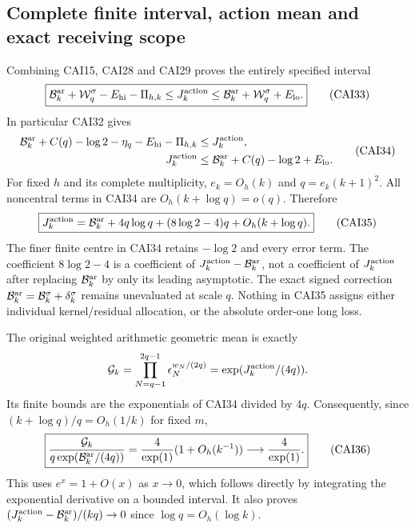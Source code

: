 \documentclass[11pt,a4paper]{article}
\begin{document}
\subsection{Complete finite interval, action mean and exact receiving scope}

Combining CAI15, CAI28 and CAI29 proves the entirely specified interval
\[
 \boxed{\mathcal B_k^{\rm ar}+\mathcal W_q^\sigma-E_{\rm hi}-\Pi_{h,k}
       \le J_k^{\rm action}
       \le\mathcal B_k^{\rm ar}+\mathcal W_q^\sigma+E_{\rm lo}.}
 \tag{CAI33}
\]
In particular CAI32 gives
\[
\begin{aligned}
 \mathcal B_k^{\rm ar}+C(q)-\log2-\eta_q-E_{\rm hi}-\Pi_{h,k}
     &\le J_k^{\rm action},\\
 J_k^{\rm action}&\le\mathcal B_k^{\rm ar}+C(q)-\log2+E_{\rm lo}.
\end{aligned}\tag{CAI34}
\]
For fixed $h$ and its complete multiplicity, $e_k=O_h(k)$ and
$q=e_k(k+1)^2$. All noncentral terms in CAI34 are
$O_h(k+\log q)=o(q)$. Therefore
\[
 \boxed{J_k^{\rm action}=\mathcal B_k^{\rm ar}
     +4q\log q+(8\log2-4)q+O_h(k+\log q).}\tag{CAI35}
\]
The finer finite centre in CAI34 retains $-\log2$ and every error term.
The coefficient $8\log2-4$ is a coefficient of
$J_k^{\rm action}-\mathcal B_k^{\rm ar}$, not a coefficient of
$J_k^{\rm action}$ after replacing $\mathcal B_k^{\rm ar}$ by only its
leading asymptotic. The exact signed correction
$\mathcal B_k^{\rm ar}=\mathcal B_k^\sigma+\delta_k^\sigma$ remains
unevaluated at scale $q$. Nothing in CAI35 assigns either individual
kernel/residual allocation, or the absolute order-one long loss.

The original weighted arithmetic geometric mean is exactly
\[
 \mathcal G_k=\prod_{N=q-1}^{2q-1}\epsilon_N^{w_N/(2q)}
             =\exp(J_k^{\rm action}/(4q)).
\]
Its finite bounds are the exponentials of CAI34 divided by $4q$.
Consequently, since $(k+\log q)/q=O_h(1/k)$ for fixed $m$,
\[
 \boxed{\frac{\mathcal G_k}{q\exp(\mathcal B_k^{\rm ar}/(4q))}
          =\frac4{\exp(1)}(1+O_h(k^{-1}))\longrightarrow\frac4{\exp(1)}.}
 \tag{CAI36}
\]
This uses $e^x=1+O(x)$ as $x\to0$, which follows directly by integrating
the exponential derivative on a bounded interval. It also proves
$(J_k^{\rm action}-\mathcal B_k^{\rm ar})/(kq)\to0$ since
$\log q=O_h(\log k)$.
\end{document}
